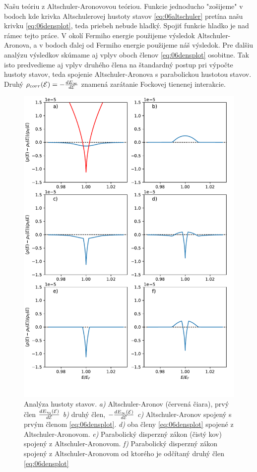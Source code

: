  Našu teóriu z Altschuler-Aronovovou teóriou. Funkcie jednoducho "zošijeme" v bodoch kde krivka Altschulerovej hustoty stavov \eqref{eq:06altschuler} pretína našu krivku \eqref{eq:06densplot}, teda priebeh nebude hladký. Spojiť funkcie hladko je nad rámec tejto práce. V okolí Fermiho energie použijeme výsledok Altschuler-Aronova, a v bodoch ďalej od Fermiho energie použijeme náš výsledok. Pre ďalšiu analýzu výsledkov skúmame aj vplyv oboch členov \eqref{eq:06densplot} osobitne. Tak isto predvedieme aj vplyv druhého člena na štandardný postup pri výpočte hustoty stavov, teda spojenie Altschuler-Aronova s parabolickou hustotou stavov. Druhý $\rho_{corr}(\mathcal{E})=-\frac{dE_{\infty}}{d\mathcal{E}}$  znamená zarátanie Fockovej tienenej interakcie.
\begin{figure}[H]
\centering
\includegraphics[scale=0.8]{grafy/plot_tau_1_c_1}
\caption{Analýza hustoty stavov. {\it a)} Altschuler-Aronov (červená čiara), prvý člen $\frac{dE_{\tau_0}(\mathcal{E})}{d\mathcal{E}}$ {\it b)} druhý člen, $-\frac{dE_{\infty}(\mathcal{E})}{d\mathcal{E}}$  {\it c)} Altschuler-Aronov spojený s prvým členom  \eqref{eq:06densplot}. {\it d)} oba členy \eqref{eq:06densplot} spojené z Altschuler-Aronovom. {\it e)} Parabolický disperzný zákon (čistý kov) spojený z Altschuler-Aronovom. {\it f)} Parabolický disperzný zákon spojený z Altschuler-Aronovom od ktorého je odčítaný druhý člen \eqref{eq:06densplot}}
\label{fig:results}
\end{figure}

